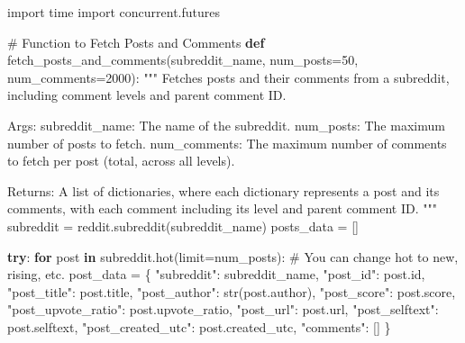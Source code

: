 \documentclass[
  12pt,
  letterpaper,
  DIV=11,
  numbers=noendperiod]{scrartcl}
\newenvironment{Shaded}{\begin{snugshade}}{\end{snugshade}}
\newcommand{\BuiltInTok}[1]{\textcolor[rgb]{0.00,0.23,0.31}{#1}}
\newcommand{\CommentTok}[1]{\textcolor[rgb]{0.37,0.37,0.37}{#1}}
\newcommand{\ControlFlowTok}[1]{\textcolor[rgb]{0.00,0.23,0.31}{\textbf{#1}}}
\newcommand{\DecValTok}[1]{\textcolor[rgb]{0.68,0.00,0.00}{#1}}
\newcommand{\ImportTok}[1]{\textcolor[rgb]{0.00,0.46,0.62}{#1}}
\newcommand{\KeywordTok}[1]{\textcolor[rgb]{0.00,0.23,0.31}{\textbf{#1}}}
\newcommand{\NormalTok}[1]{\textcolor[rgb]{0.00,0.23,0.31}{#1}}
\newcommand{\OperatorTok}[1]{\textcolor[rgb]{0.37,0.37,0.37}{#1}}
\newcommand{\StringTok}[1]{\textcolor[rgb]{0.13,0.47,0.30}{#1}}
\begin{document}
\begin{Shaded}
\begin{Highlighting}[]
\ImportTok{import}\NormalTok{ time}
\ImportTok{import}\NormalTok{ concurrent.futures}

\CommentTok{\# Function to Fetch Posts and Comments}
\KeywordTok{def}\NormalTok{ fetch\_posts\_and\_comments(subreddit\_name, num\_posts}\OperatorTok{=}\DecValTok{50}\NormalTok{, num\_comments}\OperatorTok{=}\DecValTok{2000}\NormalTok{):}
    \CommentTok{"""}
\CommentTok{    Fetches posts and their comments from a subreddit, including comment levels and parent comment ID.}

\CommentTok{    Args:}
\CommentTok{        subreddit\_name: The name of the subreddit.}
\CommentTok{        num\_posts: The maximum number of posts to fetch.}
\CommentTok{        num\_comments: The maximum number of comments to fetch per post (total, across all levels).}

\CommentTok{    Returns:}
\CommentTok{        A list of dictionaries, where each dictionary represents a post and its comments,}
\CommentTok{        with each comment including its level and parent comment ID.}
\CommentTok{    """}
\NormalTok{    subreddit }\OperatorTok{=}\NormalTok{ reddit.subreddit(subreddit\_name)}
\NormalTok{    posts\_data }\OperatorTok{=}\NormalTok{ []}

    \ControlFlowTok{try}\NormalTok{:}
        \ControlFlowTok{for}\NormalTok{ post }\KeywordTok{in}\NormalTok{ subreddit.hot(limit}\OperatorTok{=}\NormalTok{num\_posts):  }\CommentTok{\# You can change \textquotesingle{}hot\textquotesingle{} to \textquotesingle{}new\textquotesingle{}, \textquotesingle{}rising\textquotesingle{}, etc.}
\NormalTok{            post\_data }\OperatorTok{=}\NormalTok{ \{}
                \StringTok{"subreddit"}\NormalTok{: subreddit\_name,}
                \StringTok{"post\_id"}\NormalTok{: post.}\BuiltInTok{id}\NormalTok{,}
                \StringTok{"post\_title"}\NormalTok{: post.title,}
                \StringTok{"post\_author"}\NormalTok{: }\BuiltInTok{str}\NormalTok{(post.author),}
                \StringTok{"post\_score"}\NormalTok{: post.score,}
                \StringTok{"post\_upvote\_ratio"}\NormalTok{: post.upvote\_ratio,}
                \StringTok{"post\_url"}\NormalTok{: post.url,}
                \StringTok{"post\_selftext"}\NormalTok{: post.selftext,}
                \StringTok{"post\_created\_utc"}\NormalTok{: post.created\_utc,}
                \StringTok{"comments"}\NormalTok{: []}
\NormalTok{            \}}


\end{Highlighting}
\end{Shaded}
\end{document}
